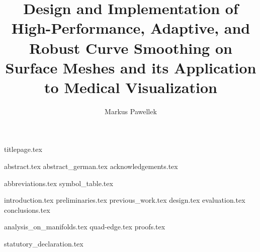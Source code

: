 \documentclass[fleqn,10pt,twoside]{stdglobal}
\title{Design and Implementation of High-Performance, Adaptive, and Robust Curve Smoothing on Surface Meshes and its Application to Medical Visualization}
\author{Markus Pawellek}
\let\oldpagenumbering\pagenumbering
\renewcommand*\pagenumbering[1]{\cleardoublepage\oldpagenumbering{#1}}
\numberwithin{figure}{section}
\numberwithin{table}{section}
\begin{document}

  {titlepage.tex}

  {abstract.tex}
  \cleardoublepage
  {abstract_german.tex}
  {acknowledgements.tex}

  \tableofcontents
  \listoffigures
  \listofmath
  {
    \small
    \listofcode
  }
  {abbreviations.tex}
  {symbol_table.tex}

  {introduction.tex}
  {preliminaries.tex}
  {previous_work.tex}
  {design.tex}
  {evaluation.tex}
  {conclusions.tex}

  \nocite{*}
  \printbibliography[heading=bibintoc]

  \appendix
  {analysis_on_manifolds.tex}
  {quad-edge.tex}
  {proofs.tex}

  {statutory_declaration.tex}
\end{document}
